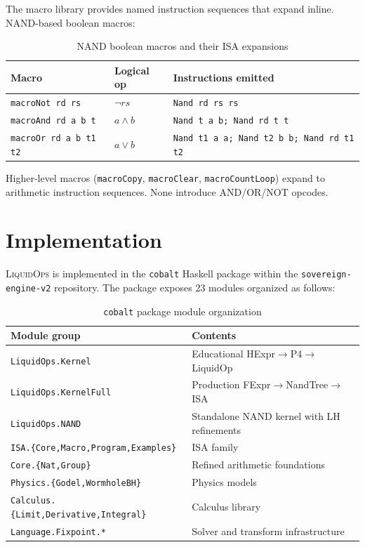 \documentclass[sigconf,natbib=false]{acmart}
\begin{document}
The macro library provides named instruction sequences that expand inline.
NAND-based boolean macros:

\begin{table}[h]
\caption{NAND boolean macros and their ISA expansions}
\begin{tabular}{lll}
\toprule
Macro & Logical op & Instructions emitted \\
\midrule
\texttt{macroNot rd rs}       & $\lnot rs$        & \texttt{Nand rd rs rs} \\
\texttt{macroAnd rd a b t}    & $a \land b$        & \texttt{Nand t a b; Nand rd t t} \\
\texttt{macroOr  rd a b t1 t2}& $a \lor b$         & \texttt{Nand t1 a a; Nand t2 b b; Nand rd t1 t2} \\
\bottomrule
\end{tabular}
\end{table}

Higher-level macros (\texttt{macroCopy}, \texttt{macroClear},
\texttt{macroCountLoop}) expand to arithmetic instruction sequences. None
introduce AND/OR/NOT opcodes.


\section{Implementation}
\label{sec:impl}

\textsc{LiquidOps} is implemented in the \texttt{cobalt} Haskell package within
the \texttt{sovereign-engine-v2} repository. The package exposes 23 modules
organized as follows:

\begin{table}[h]
\caption{\texttt{cobalt} package module organization}
\begin{tabular}{ll}
\toprule
Module group & Contents \\
\midrule
\texttt{LiquidOps.Kernel}     & Educational HExpr$\to$P4$\to$LiquidOp \\
\texttt{LiquidOps.KernelFull} & Production FExpr$\to$NandTree$\to$ISA \\
\texttt{LiquidOps.NAND}       & Standalone NAND kernel with LH refinements \\
\texttt{ISA.\{Core,Macro,Program,Examples\}} & ISA family \\
\texttt{Core.\{Nat,Group\}}   & Refined arithmetic foundations \\
\texttt{Physics.\{Godel,WormholeBH\}} & Physics models \\
\texttt{Calculus.\{Limit,Derivative,Integral\}} & Calculus library \\
\texttt{Language.Fixpoint.*}  & Solver and transform infrastructure \\
\bottomrule
\end{tabular}
\end{table}
\end{document}
